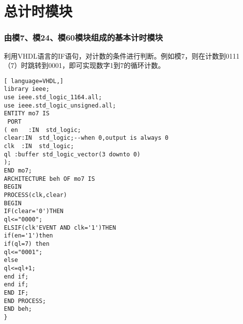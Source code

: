 \documentclass[12pt]{article}
\begin{document}
\renewcommand\refname{参考文献}

\section{总计时模块}
\subsubsection{由模7、模24、模60模块组成的基本计时模块}
利用VHDL语言的IF语句，对计数的条件进行判断。例如模7，则在计数到0111（7）时跳转到0001，即可实现数字1到7的循环计数。
\begin{lstlisting}[ language=VHDL,]
library ieee;
use ieee.std_logic_1164.all;
use ieee.std_logic_unsigned.all;
ENTITY mo7 IS 
 PORT
( en   :IN  std_logic;
clear:IN  std_logic;--when 0,output is always 0
clk  :IN  std_logic;
ql :buffer std_logic_vector(3 downto 0)
);
END mo7;
ARCHITECTURE beh OF mo7 IS
BEGIN
PROCESS(clk,clear)
BEGIN
IF(clear='0')THEN
ql<="0000";
ELSIF(clk'EVENT AND clk='1')THEN
if(en='1')then
if(ql=7) then
ql<="0001";
else
ql<=ql+1;
end if;
end if;
END IF;
END PROCESS;
END beh;
} 
\end{lstlisting} 
\end{document}
